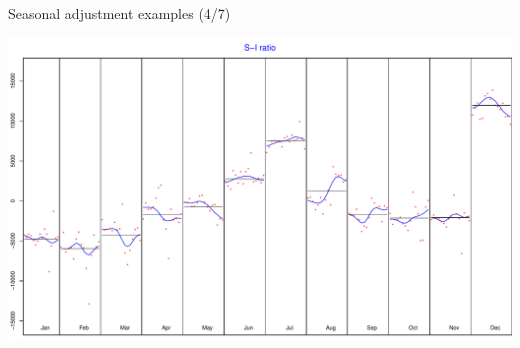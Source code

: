 \documentclass[10pt,xcolor=table,color={dvipsnames,usenames},ignorenonframetext,usepdftitle=false,french]{beamer}
\newenvironment{Shaded}{\begin{snugshade}}{\end{snugshade}}
\newcommand{\KeywordTok}[1]{\textcolor[rgb]{0.13,0.29,0.53}{\textbf{#1}}}
\newcommand{\OperatorTok}[1]{\textcolor[rgb]{0.81,0.36,0.00}{\textbf{#1}}}
\newcommand{\NormalTok}[1]{#1}
\begin{document}
\begin{frame}[fragile]{Seasonal adjustment examples (4/7)}

\begin{Shaded}
\end{Shaded}

\includegraphics{rjdemetra_files/figure-beamer/unnamed-chunk-9-1.pdf}

\end{frame}
\end{document}
